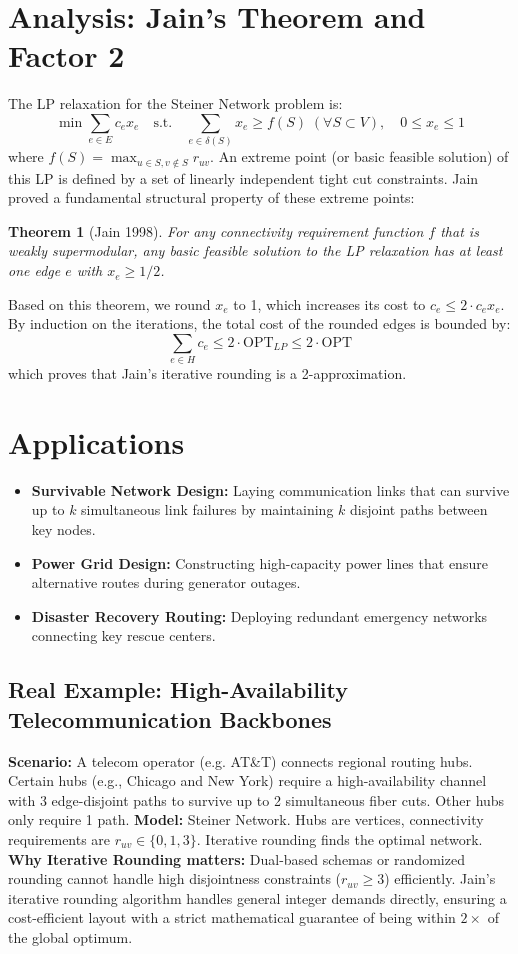 \documentclass[11pt,oneside]{book}
\newtheorem{theorem}{Theorem}[chapter]
\begin{document}
\section{Analysis: Jain's Theorem and Factor 2}
The LP relaxation for the Steiner Network problem is:
\[
\min \sum_{e \in E} c_e x_e \quad \text{s.t.} \quad \sum_{e \in \delta(S)} x_e \ge f(S) \; (\forall S \subset V), \quad 0 \le x_e \le 1
\]
where $f(S) = \max_{u \in S, v \notin S} r_{uv}$.
An extreme point (or basic feasible solution) of this LP is defined by a set of linearly independent tight cut constraints. Jain proved a fundamental structural property of these extreme points:
\begin{theorem}[Jain 1998]
For any connectivity requirement function $f$ that is weakly supermodular, any basic feasible solution to the LP relaxation has at least one edge $e$ with $x_e \ge 1/2$.
\end{theorem}
Based on this theorem, we round $x_e$ to 1, which increases its cost to $c_e \le 2 \cdot c_e x_e$. By induction on the iterations, the total cost of the rounded edges is bounded by:
\[
\sum_{e \in H} c_e \le 2 \cdot \text{OPT}_{LP} \le 2 \cdot \text{OPT}
\]
which proves that Jain's iterative rounding is a 2-approximation.

\section{Applications}
\begin{itemize}
    \item \textbf{Survivable Network Design:} Laying communication links that can survive up to $k$ simultaneous link failures by maintaining $k$ disjoint paths between key nodes.
    \item \textbf{Power Grid Design:} Constructing high-capacity power lines that ensure alternative routes during generator outages.
    \item \textbf{Disaster Recovery Routing:} Deploying redundant emergency networks connecting key rescue centers.
\end{itemize}

\subsection*{Real Example: High-Availability Telecommunication Backbones}
\textbf{Scenario:} A telecom operator (e.g. AT\&T) connects regional routing hubs. Certain hubs (e.g., Chicago and New York) require a high-availability channel with 3 edge-disjoint paths to survive up to 2 simultaneous fiber cuts. Other hubs only require 1 path.
\textbf{Model:} Steiner Network. Hubs are vertices, connectivity requirements are $r_{uv} \in \{0, 1, 3\}$. Iterative rounding finds the optimal network.
\textbf{Why Iterative Rounding matters:} Dual-based schemas or randomized rounding cannot handle high disjointness constraints ($r_{uv} \ge 3$) efficiently. Jain's iterative rounding algorithm handles general integer demands directly, ensuring a cost-efficient layout with a strict mathematical guarantee of being within $2 \times$ of the global optimum.
\end{document}
